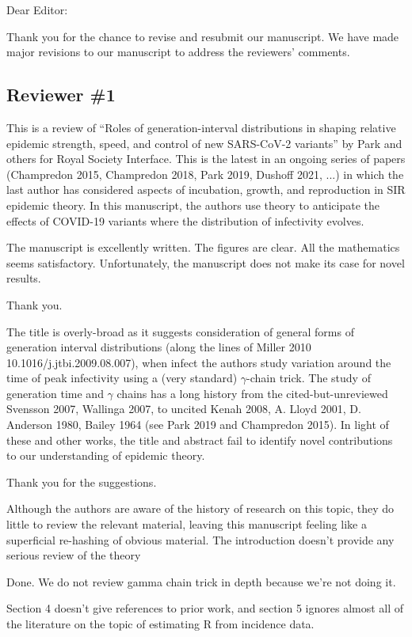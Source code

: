 \documentclass[12pt]{article}
\newcommand{\rev}{\subsection*}
\newcommand{\revtext}{\textsf}
\begin{document}
\noindent Dear Editor:

Thank you for the chance to revise and resubmit our manuscript. 
We have made major revisions to our manuscript to address the reviewers' comments.

\rev{Reviewer \#1}

\revtext{This is a review of ``Roles of generation-interval distributions in shaping relative epidemic strength, speed, and control of new SARS-CoV-2 variants'' by Park and others for Royal Society Interface.  This is the latest in an ongoing series of papers (Champredon 2015, Champredon 2018, Park 2019, Dushoff 2021, ...) in which the last author has considered aspects of incubation, growth, and reproduction in SIR epidemic theory.  In this manuscript, the authors use theory to anticipate the effects of COVID-19 variants where the distribution of infectivity evolves.}

\revtext{The manuscript is excellently written. The figures are clear.  All the mathematics seems satisfactory.  Unfortunately, the manuscript does not make its case for novel results.}

Thank you.

\revtext{The title is overly-broad as it suggests consideration of general forms of generation interval distributions (along the lines of Miller 2010 10.1016/j.jtbi.2009.08.007), when infect the authors study variation around the time of peak infectivity using a (very standard) $\gamma$-chain trick.  The study of generation time and $\gamma$ chains has a long history from the cited-but-unreviewed Svensson 2007, Wallinga 2007, to uncited Kenah 2008, A.  Lloyd 2001, D. Anderson 1980, Bailey 1964 (see Park 2019 and Champredon 2015).  In light of these and other works, the title and abstract fail to identify novel contributions to our understanding of epidemic theory.}

Thank you for the suggestions.

\revtext{Although the authors are aware of the history of research on this topic, they do little to review the relevant material, leaving this manuscript feeling like a superficial re-hashing of obvious material.  The introduction doesn't provide any serious review of the theory}

Done. We do not review gamma chain trick in depth because we're not doing it.

\revtext{Section 4 doesn't give references to prior work, and section 5 ignores almost all of the literature on the topic of estimating R from incidence data.}
\end{document}
